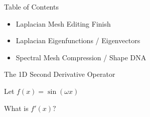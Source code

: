 \documentclass{beamer}
\begin{document}
\begin{frame}{Table of Contents}

\begin{itemize}[label=$\vartriangleright$]
	\item Laplacian Mesh Editing Finish
\end{itemize}

\begin{itemize}[label=$\blacktriangleright$]
	\item Laplacian Eigenfunctions / Eigenvectors
\end{itemize}

\begin{itemize}[label=$\vartriangleright$]
	\item Spectral Mesh Compression / Shape DNA
\end{itemize}

\end{frame}

\begin{frame}{The 1D Second Derivative Operator}

Let $f(x) = \sin(\omega x)$

What is $f'(x)?$





\end{frame}
\end{document}
